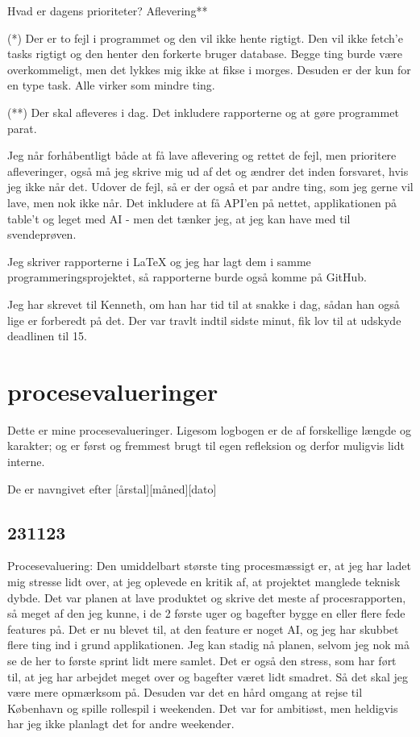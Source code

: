 \documentclass{report}
\begin{document}
Hvad er dagens prioriteter?
Aflevering**

(*)  Der er to fejl i programmet og den vil ikke hente rigtigt. Den vil ikke fetch'e tasks rigtigt og den henter den forkerte bruger database. Begge ting burde være overkommeligt, men det lykkes mig ikke at fikse i morges.
Desuden er der kun for en type task.
Alle virker som mindre ting.

(**)  Der skal afleveres i dag. Det inkludere rapporterne og at gøre programmet parat.

Jeg når forhåbentligt både at få lave aflevering og rettet de fejl, men prioritere afleveringer, også må jeg skrive mig ud af det og ændrer det inden forsvaret, hvis jeg ikke når det.
Udover de fejl, så er der også et par andre ting, som jeg gerne vil lave, men nok ikke når. Det inkludere at få API'en på nettet, applikationen på table't og leget med AI - men det tænker jeg, at jeg kan have med til svendeprøven.

Jeg skriver rapporterne i LaTeX og jeg har lagt dem i samme programmeringsprojektet, så rapporterne burde også komme på GitHub.

Jeg har skrevet til Kenneth, om han har tid til at snakke i dag, sådan han også lige er forberedt på det.
Der var travlt indtil sidste minut, fik lov til at udskyde deadlinen til 15.

\chapter{procesevalueringer}

Dette er mine procesevalueringer.
Ligesom logbogen er de af forskellige længde og karakter; og er først og fremmest brugt til egen refleksion og derfor muligvis lidt interne.\par{}
De er navngivet efter [årstal][måned][dato]

\section{231123}
Procesevaluering:
Den umiddelbart største ting procesmæssigt er, at jeg har ladet mig stresse lidt over, at jeg oplevede en kritik af, at projektet manglede teknisk dybde.
Det var planen at lave produktet og skrive det meste af procesrapporten, så meget af den jeg kunne, i de 2 første uger og bagefter bygge en eller flere fede features på.
Det er nu blevet til, at den feature er noget AI, og jeg har skubbet flere ting ind i grund applikationen. Jeg kan stadig nå planen, selvom jeg nok må se de her to første sprint lidt mere samlet.
Det er også den stress, som har ført til, at jeg har arbejdet meget over og bagefter været lidt smadret. Så det skal jeg være mere opmærksom på.
Desuden var det en hård omgang at rejse til København og spille rollespil i weekenden. Det var for ambitiøst, men heldigvis har jeg ikke planlagt det for andre weekender.
\end{document}
